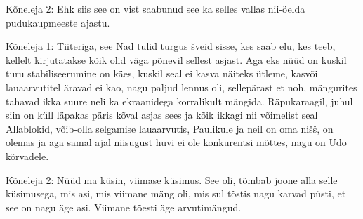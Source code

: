 Kõneleja 2:
Ehk siis see on vist saabunud see ka selles vallas nii-öelda pudukaupmeeste ajastu.
                 
Kõneleja 1:
Tiiteriga, see Nad tulid turgus šveid sisse, kes saab elu, kes teeb, kellelt kirjutatakse kõik olid väga põnevil sellest asjast. Aga eks nüüd on kuskil turu stabiliseerumine on käes, kuskil seal ei kasva näiteks ütleme, kasvõi lauaarvutitel äravad ei kao, nagu paljud lennus oli, sellepärast et noh, mängurites tahavad ikka suure neli ka ekraanidega korralikult mängida. Räpukaraagil, juhul siin on küll läpakas päris kõval asjas sees ja kõik ikkagi nii võimelist seal Allablokid, võib-olla selgamise lauaarvutis, Paulikule ja neil on oma nišš, on olemas ja aga samal ajal niisugust huvi ei ole konkurentsi mõttes, nagu on Udo kõrvadele.
                 
Kõneleja 2:
Nüüd ma küsin, viimase küsimus. See oli, tõmbab joone alla selle küsimusega, mis asi, mis viimane mäng oli, mis sul tõstis nagu karvad püsti, et see on nagu äge asi. Viimane tõesti äge arvutimängud.
                 
